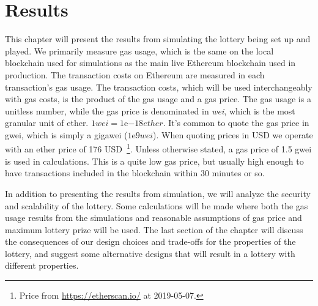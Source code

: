 \chapter{Results}
\label{chap:results}

This chapter will present the results from simulating the lottery being set up and played. We primarily measure gas usage, which is the same on the local blockchain used for simulations as the main live Ethereum blockchain used in production. The transaction costs on Ethereum are measured in each transaction's gas usage. The transaction costs, which will be used interchangeably with gas costs, is the product of the gas usage and a gas price. The gas usage is a unitless number, while the gas price is denominated in \emph{wei}, which is the most granular unit of ether. $1 wei=1 \mathrm{e}{-18} ether$. It's common to quote the gas price in gwei, which is simply a gigawei ($1\mathrm{e}{9} wei$). When quoting prices in USD we operate with an ether price of 176 USD~\footnote{Price from \url{https://etherscan.io/} at 2019-05-07.}. Unless otherwise stated, a gas price of 1.5 gwei is used in calculations. This is a quite low gas price, but usually high enough to have transactions included in the blockchain within 30 minutes or so.

In addition to presenting the results from simulation, we will analyze the security and scalability of the lottery. Some calculations will be made where both the gas usage results from the simulations and reasonable assumptions of gas price and maximum lottery prize will be used.
The last section of the chapter will discuss the consequences of our design choices and trade-offs for the properties of the lottery, and suggest some alternative designs that will result in a lottery with different properties.







